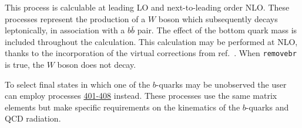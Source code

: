 \label{subsec:wbb}

This process is calculable at leading LO and next-to-leading order NLO.
These processes represent the production of a $W$ boson which subsequently
decays leptonically, in association with a $b{\bar b}$ pair. The effect of
the bottom quark mass is included throughout the calculation.
This calculation may be performed at NLO, thanks to
the incorporation of the virtual corrections from ref.~\cite{Badger:2010mg}.
When {\tt removebr} is true, the $W$ boson does not decay.

To select final states in which one of the $b$-quarks may be unobserved the
user can employ processes \href{https://mcfm.fnal.gov/processes//process401.html}{401-408} instead.
These processes use the same matrix
elements but make specific requirements on the kinematics of the $b$-quarks
and QCD radiation.

